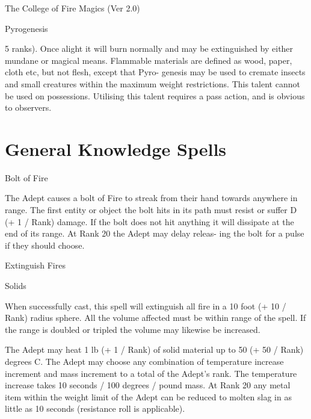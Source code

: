 \begin{Chapter}{The College of Fire Magics (Ver 2.0)}
\begin{talent}[T-2]{Pyrogenesis }
\begin{effects}
5 ranks). Once alight it will burn normally and may 
be  extinguished  by  either  mundane  or  magical 
means.  Flammable  materials  are  defined  as  wood, 
paper,  cloth  etc,  but  not  flesh,  except  that  Pyro-
genesis  may  be  used  to  cremate  insects  and  small 
creatures  within  the  maximum  weight  restrictions. 
This talent cannot be used on possessions. Utilising 
this talent requires a pass action, and is obvious to 
observers. 


\end{effects}
\end{talent}

\section{General Knowledge Spells}

\begin{spell}[G-1]{Bolt of Fire }

\begin{effects}
 The  Adept  causes  a  bolt  of  Fire  to  streak 
from  their  hand  towards  anywhere  in  range.  The 
first  entity  or  object  the  bolt  hits  in  its  path  must 
resist  or  suffer  D  (+  1  / Rank)  damage.  If  the  bolt 
does not hit anything it will dissipate at the end of 
its range. At Rank 20 the Adept may delay releas-
ing the bolt for a pulse if they should choose. 

\end{effects}
\end{spell}

\begin{spell}[G-2]{Extinguish Fires }

Solids 

\begin{effects}
 When  successfully  cast,  this  spell  will 
extinguish all fire in a 10 foot (+ 10 / Rank) radius 
sphere.  All  the  volume  affected  must  be  within 
range of the spell. If the range is doubled or tripled 
the volume may likewise be increased. 

The  Adept  may  heat  1  lb  (+  1  /  Rank)  of  solid 
material  up  to  50  (+  50  /  Rank)  degrees  C.  The 
Adept may choose any combination of temperature 
increase increment and mass increment to a total of 
the  Adept’s  rank.  The  temperature  increase  takes 
10 seconds / 100 degrees / pound mass. At Rank 20 
any metal item within the weight limit of the Adept 
can  be  reduced  to  molten  slag  in  as  little  as  10 
seconds (resistance roll is applicable). 


\end{effects}
\end{spell}
\end{Chapter}

